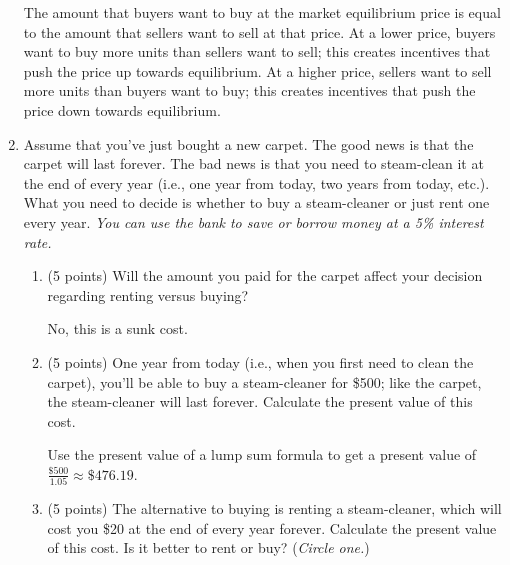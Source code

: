 \documentclass{article}
\begin{document}
\begin{enumerate}
\begin{KEY} The amount that buyers want to buy at the market equilibrium price is equal to the amount that sellers want to sell at that price. At a lower price, buyers want to buy more units than sellers want to sell; this creates incentives that push the price up towards equilibrium. At a higher price, sellers want to sell more units than buyers want to buy; this creates incentives that push the price down towards equilibrium. \end{KEY} 




\item \begin{EXAM} Assume that you've just bought a new carpet. The good news is that the carpet will last forever. The bad news is that you need to steam-clean it at the end of every year (i.e., one year from today, two years from today, etc.). What you need to decide is whether to buy a steam-cleaner or just rent one every year. \emph{You can use the bank to save or borrow money at a 5\% interest rate.}\end{EXAM}

    \begin{enumerate}
    
    \item \begin{EXAM} (5 points) Will the amount you paid for the carpet affect your decision regarding renting versus buying? \vspace{1in} \end{EXAM}
    
\begin{KEY}
No, this is a sunk cost. 
\end{KEY}


    \item \begin{EXAM} (5 points) One year from today (i.e., when you first need to clean the carpet), you'll be able to buy a steam-cleaner for \$500; like the carpet, the steam-cleaner will last forever. Calculate the present value of this cost. \vspace{1in} \end{EXAM}
    
\begin{KEY}
Use the present value of a lump sum formula to get a present value of $\frac{\$500}{1.05}\approx \$476.19$.
\end{KEY}


    \item \begin{EXAM} (5 points) The alternative to buying is renting a steam-cleaner, which will cost you \$20 at the end of every year forever. Calculate the present value of this cost. Is it better to rent or buy? (\emph{Circle one.}) \vspace{1in} \end{EXAM}
    

\end{enumerate}
\end{enumerate}
\end{document}
